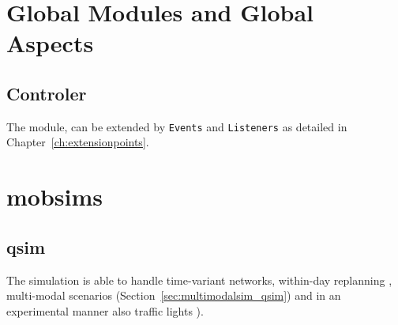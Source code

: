 \section{Global Modules and Global Aspects}
\label{sec:globalmodules}
\subsection{Controler}
\label{sec:controler}
The module, can be extended by \lstinline|Events| and \lstinline|Listeners| as detailed in Chapter~\ref{ch:extensionpoints}. 
%


\section{\protect\glspl{mobsim}}
\label{sec:mobsims}
\subsection{\protect\gls{qsim}}
\label{sec:qsim}
The simulation is able to handle time-variant networks, within-day replanning \citep[][]{Dobler_TechRep_IVT_2009}, multi-modal scenarios (Section~\ref{sec:multimodalsim_qsim}) and in an experimental manner also traffic lights \citep[][]{Neumann_MastersThesis_2008}).

